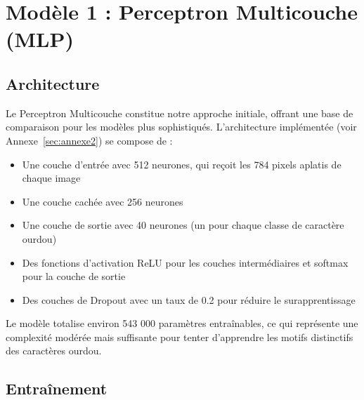 \section{Modèle 1 : Perceptron Multicouche (MLP)}

\subsection{Architecture}

\begin{flushleft}
Le Perceptron Multicouche constitue notre approche initiale, offrant une base de comparaison pour les modèles plus sophistiqués. L'architecture implémentée (voir Annexe~\ref{sec:annexe2}) se compose de :

\begin{itemize}
\item Une couche d'entrée avec 512 neurones, qui reçoit les 784 pixels aplatis de chaque image
\item Une couche cachée avec 256 neurones
\item Une couche de sortie avec 40 neurones (un pour chaque classe de caractère ourdou)
\item Des fonctions d'activation ReLU pour les couches intermédiaires et softmax pour la couche de sortie
\item Des couches de Dropout avec un taux de 0.2 pour réduire le surapprentissage
\end{itemize}

Le modèle totalise environ 543 000 paramètres entraînables, ce qui représente une complexité modérée mais suffisante pour tenter d'apprendre les motifs distinctifs des caractères ourdou.
\end{flushleft}

\subsection{Entraînement}

